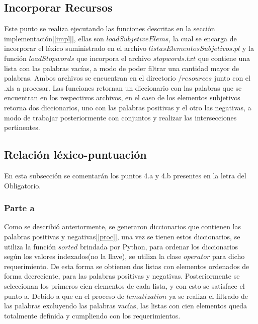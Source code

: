 \documentclass[12pt]{article}
\begin{document}
\subsection{Incorporar Recursos}
Este punto se realiza ejecutando las funciones descritas en la sección implementación[\ref{impl}], ellas son $loadSubjetiveElems$, la cual se encarga de incorporar el léxico suministrado en el archivo $listasElementosSubjetivos.pl$ y la función $loadStopwords$ que incorpora el archivo $stopwords.txt$ que contiene una lista con las palabras vacías, a modo de poder filtrar una cantidad mayor de palabras.
Ambos archivos se encuentran en el directorio $/resources$ junto con el .xls a procesar.
Las funciones retornan un diccionario con las palabras que se encuentran en los respectivos archivos, en el caso de los elementos subjetivos retorna dos diccionarios, uno con las palabras positivas y el otro las negativas, a modo de trabajar posteriormente con conjuntos y realizar las intersecciones pertinentes.


\subsection{Relación léxico-puntuación}
En esta subsección se comentarán los puntos 4.a y 4.b presentes en la letra del Obligatorio.

\subsubsection{Parte a}
Como se describió anteriormente, se generaron diccionarios que contienen las palabras positivas y negativas[\ref{proc}], una vez se tienen estos diccionarios, se utiliza la función $sorted$ brindada por Python, para ordenar los diccionarios según los valores indexados(no la llave), se utiliza la clase $operator$ para dicho requerimiento. De esta forma se obtienen dos listas con elementos ordenados de forma decreciente, para las palabras positivas y negativas. Posteriormente se seleccionan los primeros cien elementos de cada lista, y con esto se satisface el punto a. Debido a que en el proceso de $lematization$ ya se realiza el filtrado de las palabras excluyendo las palabras vacías, las listas con cien elementos queda totalmente definida y cumpliendo con los requerimientos.
\end{document}

